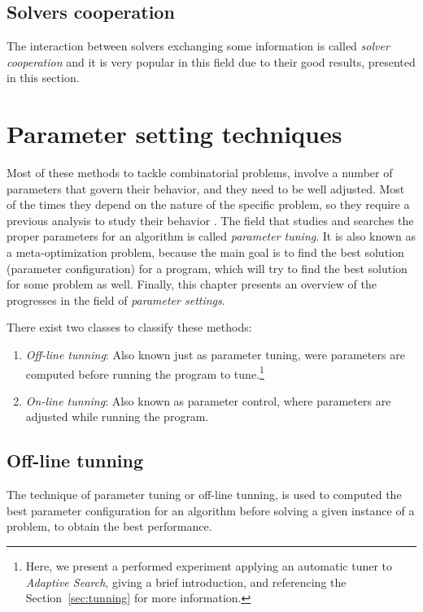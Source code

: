 \documentclass[a4paper]{book} %
\begin{document}
\subsection{Solvers cooperation}

The interaction between solvers exchanging some information is called {\it solver cooperation} and it is very popular in this field due to their good results, presented in this section.

\section{Parameter setting techniques}

Most of these methods to tackle combinatorial problems, involve a number of parameters that govern their behavior, and they need to be well adjusted. Most of the times they depend on the nature of the specific problem, so they require a previous analysis to study their behavior \cite{Birattari2005}. The field that studies and searches the proper parameters for an algorithm is called {\it parameter tuning}. It is also known as a meta-optimization problem, because the main goal is to find the best solution (parameter configuration) for a program, which will try to find the best solution for some problem as well. Finally, this chapter presents an overview of the progresses in the field of \textit{parameter settings}.

There exist two classes to classify these methods: 
\begin{enumerate}
\item \textit{Off-line tunning}: Also known just as parameter tuning, were parameters are computed before running the program to tune.\footnote{Here, we present a performed experiment applying an automatic tuner to \textit{Adaptive Search}, giving a brief introduction, and referencing the Section~\ref{sec:tunning} for more information.}
\item \textit{On-line tunning}: Also known as parameter control, where parameters are adjusted while running the program.
\end{enumerate}

\subsection{Off-line tunning}

The technique of parameter tuning or off-line tunning, is used to computed the best parameter configuration for an algorithm before solving a given instance of a problem, to obtain the best performance.
\end{document}
